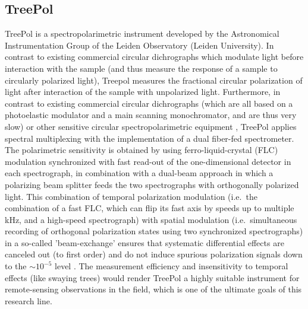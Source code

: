 \documentclass[review]{elsarticle}
\begin{document}
\subsection{TreePol}
TreePol is a spectropolarimetric instrument developed by the Astronomical Instrumentation Group of the Leiden Observatory (Leiden University). In contrast to existing commercial circular dichrographs which modulate light before interaction with the sample (and thus measure the response of a sample to circularly polarized light), Treepol measures the fractional circular polarization of light after interaction of the sample with unpolarized light. Furthermore, in contrast to existing commercial circular dichrographs \cite{Greenfield2006} (which are all based on a photoelastic modulator and a main scanning monochromator, and are thus very slow) or other sensitive circular spectropolarimetric equipment \cite{Sparks2009, Sparks2009a}, TreePol applies spectral multiplexing with the implementation of a dual fiber-fed spectrometer. The polarimetric sensitivity is obtained by using ferro-liquid-crystal (FLC) modulation synchronized with fast read-out of the one-dimensional detector in each spectrograph, in combination with a dual-beam approach in which a polarizing beam splitter feeds the two spectrographs with orthogonally polarized light. This combination of temporal polarization modulation (i.e.~the combination of a fast FLC, which can flip its fast axis by speeds up to multiple kHz, and a high-speed spectrograph) with spatial modulation (i.e.~simultaneous recording of orthogonal polarization states using two synchronized spectrographs) in a so-called 'beam-exchange' ensures that systematic differential effects are canceled out (to first order) and do not induce spurious polarization signals down to the $\sim 10^{-5}$ level \cite{Snik2013}. The measurement efficiency and insensitivity to temporal effects (like swaying trees) would render TreePol a highly suitable instrument for remote-sensing observations in the field, which is one of the ultimate goals of this research line. 
\end{document}
